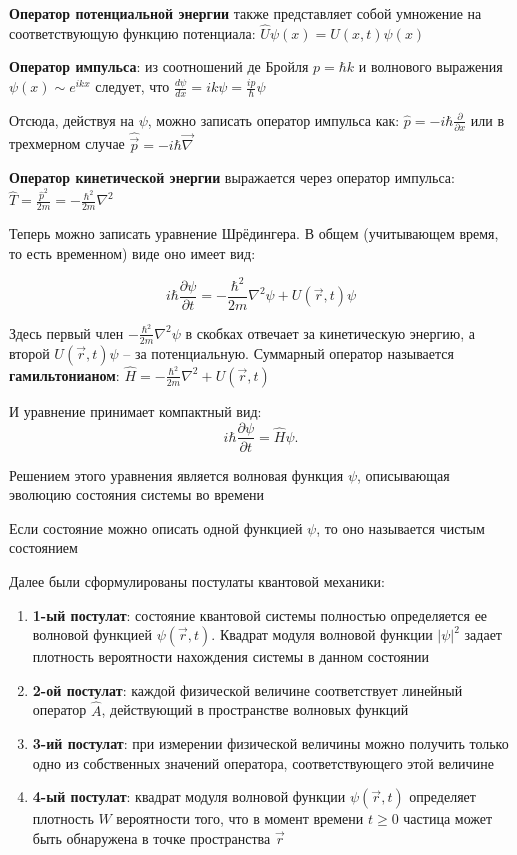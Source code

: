 \documentclass[12pt]{article}
\begin{document}
\textbf{Оператор потенциальной энергии} также представляет собой умножение на соответствующую функцию потенциала: $\hat{U}\psi(x) = U(x, t)\psi(x)$

\textbf{Оператор импульса}: из соотношений де Бройля $p = \hbar k$ и волнового выражения $\psi(x) \sim e^{ikx}$ следует, что $\frac{d\psi}{dx} = i k \psi = \frac{i p}{\hbar}\psi$

Отсюда, действуя на $\psi$, можно записать оператор импульса как: $\hat{p} = - i \hbar \frac{\partial}{\partial x}$ или в трехмерном случае $\hat{\vec{p}} = - i \hbar \vec{\nabla}$

\textbf{Оператор кинетической энергии} выражается через оператор импульса: $\hat{T} = \frac{\hat{p}^2}{2m} = -\frac{\hbar^2}{2m}\nabla^2$

\mediumvspace

Теперь можно записать уравнение Шрёдингера. В общем (учитывающем время, то есть временном) виде оно имеет вид:

\[
i\hbar \frac{\partial \psi}{\partial t} = -\frac{\hbar^2}{2m}\nabla^2 \psi + U(\vec r, t)\psi
\]

Здесь первый член $-\frac{\hbar^2}{2m}\nabla^2 \psi$ в скобках отвечает за кинетическую энергию, а второй $U(\vec r, t) \psi$ -- за потенциальную. Суммарный оператор называется \textbf{гамильтонианом}: $\hat{H} = -\frac{\hbar^2}{2m}\nabla^2 + U(\vec r, t)$

И уравнение принимает компактный вид:
\[
i\hbar \frac{\partial \psi}{\partial t} = \hat{H}\psi.
\]

\mediumvspace

Решением этого уравнения является волновая функция $\psi$, описывающая эволюцию состояния системы во времени

Если состояние можно описать одной функцией $\psi$, то оно называется чистым состоянием

\mediumvspace

Далее были сформулированы постулаты квантовой механики:

\begin{enumerate}
    \item \textbf{1-ый постулат}: 
    состояние квантовой системы полностью определяется ее волновой функцией $\psi(\vec r, t)$.  
    Квадрат модуля волновой функции $|\psi|^2$ задает плотность вероятности нахождения системы в данном состоянии
    
    \item \textbf{2-ой постулат}:
    каждой физической величине соответствует линейный оператор $\hat{A}$, действующий в пространстве волновых функций
    
    \item \textbf{3-ий постулат}: 
    при измерении физической величины можно получить только одно из собственных значений оператора, соответствующего этой величине
    
    \item \textbf{4-ый постулат}:
    квадрат модуля волновой функции $\psi(\vec r, t)$
    определяет плотность $W$ вероятности того, что в момент времени $t \geq 0$ частица может быть обнаружена в точке пространства $\vec r$ 
\end{enumerate}
\end{document}
